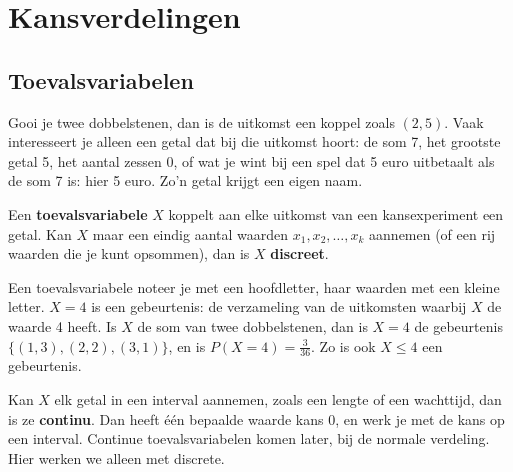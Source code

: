 \begin{oefeningen}[Start]

\end{oefeningen}


\section{Kansverdelingen}

\subsection{Toevalsvariabelen}

Gooi je twee dobbelstenen, dan is de uitkomst een koppel zoals $(2, 5)$. Vaak interesseert je alleen een getal dat bij die uitkomst hoort: de som 7, het grootste getal 5, het aantal zessen 0, of wat je wint bij een spel dat 5 euro uitbetaalt als de som 7 is: hier 5 euro. Zo'n getal krijgt een eigen naam.

\begin{theorie}
Een \textbf{\textcolor{accent}{toevalsvariabele}} $X$ koppelt aan elke uitkomst van een kansexperiment een getal. Kan $X$ maar een eindig aantal waarden $x_1, x_2, \ldots, x_k$ aannemen (of een rij waarden die je kunt opsommen), dan is $X$ \textbf{\textcolor{accent}{discreet}}.
\end{theorie}

Een toevalsvariabele noteer je met een hoofdletter, haar waarden met een kleine letter. \textit{$X = 4$} is een gebeurtenis: de verzameling van de uitkomsten waarbij $X$ de waarde 4 heeft. Is $X$ de som van twee dobbelstenen, dan is \textit{$X = 4$} de gebeurtenis $\{(1, 3), (2, 2), (3, 1)\}$, en is $P(X = 4) = \frac{3}{36}$. Zo is ook \textit{$X \leqslant 4$} een gebeurtenis.

Kan $X$ elk getal in een interval aannemen, zoals een lengte of een wachttijd, dan is ze \textbf{continu}. Dan heeft één bepaalde waarde kans 0, en werk je met de kans op een interval. Continue toevalsvariabelen komen later, bij de normale verdeling. Hier werken we alleen met discrete.

